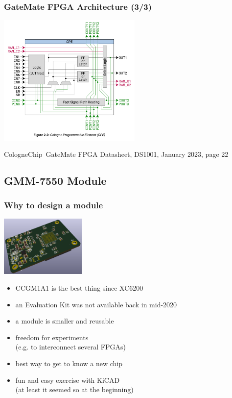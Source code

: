 \begin{frame}
  \frametitle{GateMate FPGA Architecture (3/3)}
  \vspace{-.5cm}
  \begin{center}
    \includegraphics[height=6.5cm]{Figure_2.2.png}

    \footnotesize{{CologneChip~GateMate} FPGA Datasheet, DS1001, January 2023, page 22}
  \end{center}
\end{frame}

\subsection{GMM-7550 Module}

\begin{frame}
  \frametitle{Why to design a module}

  \begin{flushright}
    \includegraphics[height=3cm]{GMM-7550_preview_2020-10-01.png}
  \end{flushright}
  \vspace{-4cm}

  \begin{minipage}{6.5cm}
  \begin{itemize}
    \item CCGM1A1 is the best thing since XC6200
    \item an Evaluation Kit was not available back in mid-2020
    \item a module is smaller and reusable
    \item freedom for experiments\\(e.g. to interconnect several FPGAs)
    \item best way to get to know a new chip
  \end{itemize}
  \end{minipage}
  \begin{itemize}
    \item fun and easy exercise with KiCAD\\(at least it seemed so at
  the beginning)
  \end{itemize}
\end{frame}

